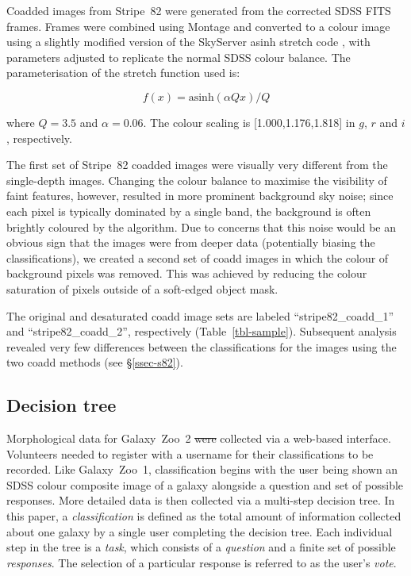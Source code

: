 \documentclass[useAMS,usenatbib]{mn2e}
\providecommand{\DIFaddtex}[1]{{\protect\color{blue}\uwave{#1}}} %
\providecommand{\DIFdeltex}[1]{{\protect\color{red}\sout{#1}}}                      %
\providecommand{\DIFaddbegin}{} %
\providecommand{\DIFaddend}{} %
\providecommand{\DIFdelbegin}{} %
\providecommand{\DIFdelend}{} %
\providecommand{\DIFadd}[1]{\texorpdfstring{\DIFaddtex{#1}}{#1}} %
\providecommand{\DIFdel}[1]{\texorpdfstring{\DIFdeltex{#1}}{}} %
\begin{document}
Coadded images from Stripe~82 were generated from the corrected SDSS FITS frames. Frames were combined using Montage \citep{jac10} and converted to a colour image using a slightly modified version of the SkyServer asinh stretch code \citep{lup04}, with parameters adjusted to replicate the normal SDSS colour balance. The parameterisation of the stretch function used is:
\DIFdelbegin %

\DIFdelend \begin{equation}
f(x)=\text{asinh}(\alpha Q x)/Q         %
\label{eqn-imagegen}
\end{equation}
\DIFdelbegin %

\DIFdelend where $Q=3.5$ and $\alpha=0.06$. The colour scaling is [1.000,1.176,1.818] in $g$, $r$ and $i$, respectively. 

The first set of Stripe~82 coadded images were visually very different from the single-depth images. Changing the colour balance to maximise the visibility of faint features, however, resulted in more prominent background sky noise; since each pixel is typically dominated by a single band, the background is often brightly coloured by the \citet{lup04} algorithm. Due to concerns that this noise would be an obvious sign that the images were from deeper data (potentially biasing the classifications), we created a second set of coadd images in which the colour of background pixels was removed. This was achieved by reducing the colour saturation of pixels outside of a soft-edged object mask. 

The original and desaturated coadd image sets are labeled ``stripe82\_coadd\_1'' and ``stripe82\_coadd\_2'', respectively (Table~\ref{tbl-sample}). Subsequent analysis revealed very few differences between the classifications for the images using the two coadd methods (see \S\ref{ssec-s82}). 

\subsection{Decision tree}\label{ssec-decision_tree}

Morphological data for Galaxy~Zoo~2 \DIFdelbegin \DIFdel{were }\DIFdelend \DIFaddbegin \DIFadd{was }\DIFaddend collected via a web-based interface. Volunteers needed to register with a username for their classifications to be recorded. Like Galaxy~Zoo~1, classification begins with the user being shown an SDSS colour composite image of a galaxy alongside a question and set of possible responses. More detailed data is then collected via a multi-step decision tree. In this paper, a {\it classification} is defined as the total amount of information collected about one galaxy by a single user completing the decision tree. Each individual step in the tree is a {\it task}, which consists of a {\it question} and a finite set of possible {\it responses}. The selection of a particular response is referred to as the user's {\it vote}.  
\end{document}
